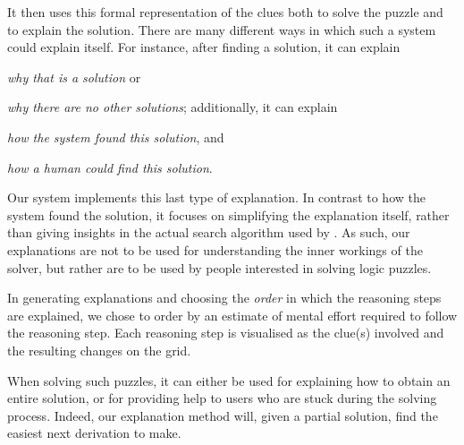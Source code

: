 It then uses this formal representation of the clues both to solve the puzzle and to explain the solution. 
There are many different ways in which such a system could explain itself. For instance, after finding a solution, it can explain \begin{inparaenum}\item \emph{why that is a solution} or \item \emph{why there are no other solutions}; additionally, it can explain \item \emph{how the system found this solution}, and \item \emph{how a human could find this solution}. \end{inparaenum}

Our system implements this last type of explanation. In contrast to how the system found the solution, it focuses on simplifying the explanation itself, rather than giving insights in the actual search algorithm used by \idp. As such, our explanations are not to be used for understanding the inner workings of the solver, but rather are to be used by people interested in solving logic puzzles.

In generating explanations and choosing the \textit{order} in which the reasoning steps are explained, we chose to order by an estimate of mental effort required to follow the reasoning step. Each reasoning step is visualised as the clue(s) involved and the resulting changes on the grid.

When solving such puzzles, it can either be used for explaining how to obtain an entire solution, or for providing help to users who are stuck during the solving process. Indeed, our explanation method will, given a partial solution, find the easiest next derivation to make. 
